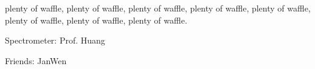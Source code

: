 \begin{acknowledgements}
plenty of waffle, plenty of waffle, plenty of waffle, plenty of waffle,
plenty of waffle, plenty of waffle, plenty of waffle, plenty of waffle.

Spectrometer:
Prof. Huang

Friends:
JanWen

\end{acknowledgements}

